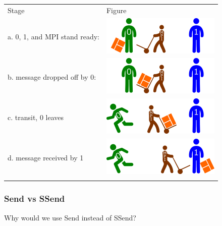 \begin{longtable}[c]{@{}ll@{}}
\toprule\addlinespace
Stage & Figure
\\\addlinespace
\midrule\endhead
a. 0, 1, and MPI stand ready: &
\includegraphics{06MPI/figures/sync0.png}
\\\addlinespace
b. message dropped off by 0: & \includegraphics{06MPI/figures/sync1.png}
\\\addlinespace
c. transit, 0 leaves & \includegraphics{06MPI/figures/ssyncT.png}
\\\addlinespace
d. message received by 1 & \includegraphics{06MPI/figures/ssyncA.png}
\\\addlinespace
\bottomrule
\end{longtable}

\subsubsection{Send vs SSend}\label{send-vs-ssend}

Why would we use Send instead of SSend?

